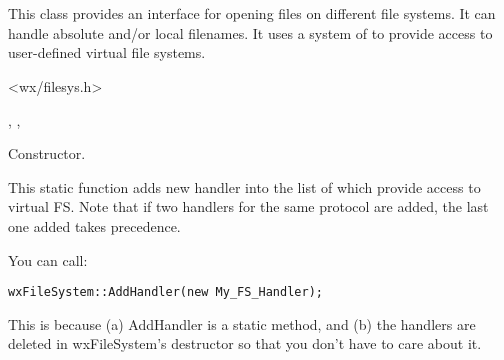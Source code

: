 %
%

\section{}\label{wxfilesystem}

This class provides an interface for opening files on different
file systems. It can handle absolute and/or local filenames.
It uses a system of  to
provide access to user-defined virtual file systems.




<wx/filesys.h>


, 
, 



\label{wxfilesystemwxfilesystem}


Constructor. 


\label{wxfilesystemaddhandler}


This static function adds new handler into the list of 
 which provide access to virtual FS.
Note that if two handlers for the same protocol are added, the last one added
takes precedence.


You can call:

\begin{verbatim}
wxFileSystem::AddHandler(new My_FS_Handler);
\end{verbatim}

This is because (a) AddHandler is a static method, and (b) the handlers
are deleted in wxFileSystem's destructor so that you don't have to
care about it.


\label{wxfilesystemhashandlerforpath}


